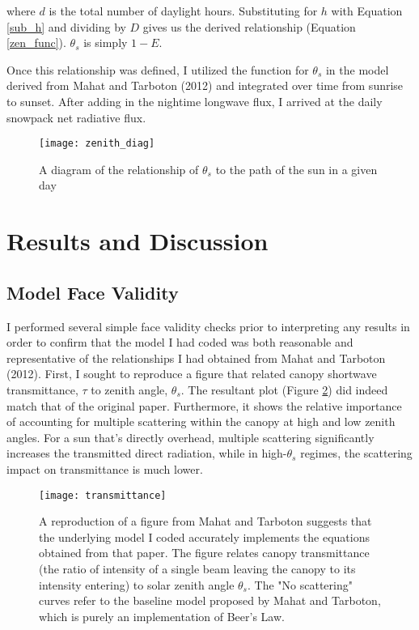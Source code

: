 \documentclass[
10pt, %
letterpaper, %
oneside, %
headinclude,footinclude, %
BCOR5mm, %
]{scrartcl}
\begin{document}
where $d$ is the total number of daylight hours. Substituting for $h$ with Equation \ref{sub_h} and dividing by $D$ gives us the derived relationship (Equation \ref{zen_func}). $\theta_s$ is simply $1-E$.

Once this relationship was defined, I utilized the function for $\theta_s$ in the model derived from Mahat and Tarboton (2012) and integrated over time from sunrise to sunset. After adding in the nightime longwave flux, I arrived at the daily snowpack net radiative flux.

\begin{figure}
\centering 
\texttt{[image: zenith\_diag]} 
\caption{A diagram of the relationship of $\theta_s$ to the path of the sun in a given day}
\label{fig:zen_diag} 
\end{figure}



\section{Results and Discussion}

\subsection{Model Face Validity} \label{valid}
I performed several simple face validity checks prior to interpreting any results in order to confirm that the model I had coded was both reasonable and representative of the relationships I had obtained from Mahat and Tarboton (2012). First, I sought to reproduce a figure that related canopy shortwave transmittance, $\tau$ to zenith angle, $\theta_s$. The resultant plot (Figure \ref{fig:t_z}) did indeed match that of the original paper. Furthermore, it shows the relative importance of accounting for multiple scattering within the canopy at high and low zenith angles. For a sun that's directly overhead, multiple scattering significantly increases the transmitted direct radiation, while in high-$\theta_s$ regimes, the scattering impact on transmittance is much lower.

\begin{figure}
\centering 
\texttt{[image: transmittance]} 
\caption{A reproduction of a figure from Mahat and Tarboton suggests that the underlying model I coded accurately implements the equations obtained from that paper. The figure relates canopy transmittance (the ratio of intensity of a single beam leaving the canopy to its intensity entering) to solar zenith angle $\theta_s$. The "No scattering" curves refer to the baseline model proposed by Mahat and Tarboton, which is purely an implementation of Beer's Law.}
\label{fig:t_z} 
\end{figure}
\end{document}
